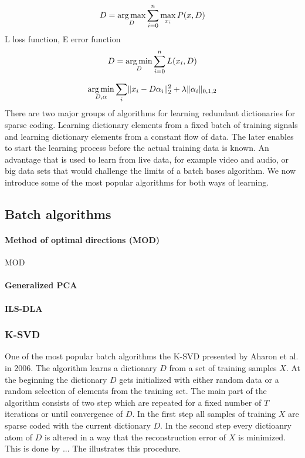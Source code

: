 \begin{align} 
D = \operatorname*{arg\,max}_{D} \sum_{i=0}^n \max_{x_i} P(x,D)
\end{align}
L loss function, E error function
\begin{align} 
D = \operatorname*{arg\,min}_{D} \sum_{i=0}^n L(x_i,D)
\end{align}

\begin{align} 
\operatorname*{arg\,min}_{D,\alpha} \sum_{i}
\lVert x_i - D\alpha_i \rVert^{2}_{2}  +  \lambda \lVert \alpha_i
\rVert_{0,1,2}
\end{align}
There are two major groups of algorithms for learning redundant dictionaries for
sparse coding. Learning dictionary elements from a fixed batch of training
signals and learning dictionary elements from a constant flow of data. The later
enables to start the learning process before the actual training data is known.
An advantage that is used to learn from live data, for example video and audio,
or big data sets that would challenge the limits of a batch bases algorithm. We
now introduce some of the most popular algorithms for both ways of learning.

\subsection{Batch algorithms}
\paragraph{Method of optimal directions (MOD)}
MOD\cite{Engan1999a}
\paragraph{Generalized PCA}
\cite{?}
\paragraph{ILS-DLA}
\cite{Engan2007}


\subsubsection{K-SVD}
\label{sec:k-svd}
One of the most popular batch algorithms the K-SVD presented by
Aharon et al. in 2006\cite{Aharon2006}. The algorithm learns a dictionary $D$
from a set of training samples $X$. At the beginning the dictionary $D$ gets
initialized with either random data or a random selection of elements from the
training set. The main part of the algorithm consists of two step which are
repeated for a fixed number of $T$ iterations or until convergence of $D$. In
the first step all samples of training $X$ are sparse coded with the current
dictionary $D$. In the second step every dictioanry atom of $D$ is altered in a
way that the reconstruction error of $X$ is minimized. 
This is done by ...
The  illustrates this procedure. 

